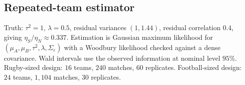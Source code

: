 \subsection*{Repeated-team estimator}

Truth: $\tau^2=1$, $\lambda=0.5$, residual variances $(1,1.44)$, residual correlation $0.4$, giving $\eta_S/\eta_N\approx 0.337$.
Estimation is Gaussian maximum likelihood for $(\mu_A,\mu_B,\tau^2,\lambda,\Sigma_\varepsilon)$ with a Woodbury likelihood checked against a dense covariance.
Wald intervals use the observed information at nominal level $95\%$.
Rugby-sized design: $16$ teams, $240$ matches, $60$ replicates.
Football-sized design: $24$ teams, $1{,}104$ matches, $30$ replicates.
